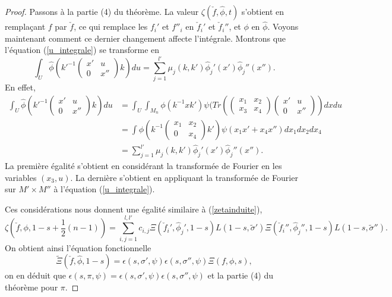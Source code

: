 \begin{proof}
Passons à la partie (4) du théorème. La valeur $\zeta(\check{f}, \hat{\phi}, t)$ s'obtient en remplaçant $f$ par $\check{f}$, ce qui remplace les $f_i'$ et $f''_i$ en $\check{f}_i'$ et $\check{f}_i''$, et $\phi$ en $\hat{\phi}$. Voyons maintenant comment ce dernier changement affecte l'intégrale. Montrons que l'équation (\ref{u_integrale}) se transforme en
\begin{equation}
\int_U \hat{\phi}(k'^{-1}\begin{pmatrix} 
x' & u \\
0 & x'' 
\end{pmatrix} k) du = \sum_{j=1}^{l'} \mu_j(k, k')\hat{\phi}_j'(x')\hat{\phi}_j''(x'').
\end{equation}
En effet, 
\begin{align}
\int_U \hat{\phi}(k'^{-1}\begin{pmatrix} 
x' & u \\
0 & x'' 
\end{pmatrix} k) du &= \int_U \int_{M_n} \phi(k^{-1}xk')\psi(Tr(\begin{pmatrix} 
x_1 & x_2 \\
x_3 & x_4 
\end{pmatrix}\begin{pmatrix} 
x' & u \\
0 & x'' 
\end{pmatrix})dxdu \\
&= \int \phi(k^{-1}\begin{pmatrix} 
x_1 & x_2 \\
0 & x_4 
\end{pmatrix}k')\psi(x_1x'+x_4x'')dx_1dx_2dx_4 \\
&= \sum_{j=1}^{l'} \mu_j(k, k')\hat{\phi}_j'(x')\hat{\phi}_j''(x'').
\end{align}
La première égalité s'obtient en considérant la transformée de Fourier en les variables $(x_3, u)$. La dernière s'obtient en appliquant la transformée de Fourier sur $M'\times M''$ à l'équation (\ref{u_integrale}).

Ces considérations nous donnent une égalité similaire à (\ref{zetainduite}),
\begin{equation}
\zeta(\check{f},\phi,1-s+\frac{1}{2}(n-1))=\sum_{i,j=1}^{l,l'}c_{i,j}\Xi(\check{f}_i',\hat{\phi}_j',1-s)L(1-s,\tilde{\sigma}')\Xi(\check{f}_i'',\hat{\phi}_j'',1-s)L(1-s,\tilde{\sigma}'').
\end{equation}
On obtient ainsi l'équation fonctionnelle
\begin{equation}
\tilde{\Xi}(\check{f}, \hat{\phi}, 1-s)=\epsilon(s, \sigma', \psi)\epsilon(s,\sigma'',\psi)\Xi(f,\phi,s),
\end{equation}
on en déduit que $\epsilon(s,\pi,\psi)=\epsilon(s, \sigma', \psi)\epsilon(s,\sigma'',\psi)$ et la partie (4) du théorème pour $\pi$.


\end{proof}
